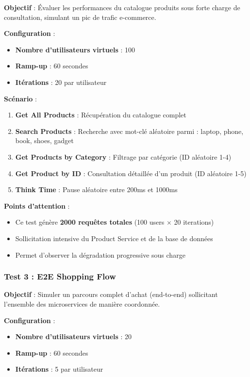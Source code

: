 \textbf{Objectif} : Évaluer les performances du catalogue produits sous forte charge de consultation, simulant un pic de trafic e-commerce.

\textbf{Configuration} :
\begin{itemize}
    \item \textbf{Nombre d'utilisateurs virtuels} : 100
    \item \textbf{Ramp-up} : 60 secondes
    \item \textbf{Itérations} : 20 par utilisateur
\end{itemize}

\textbf{Scénario} :
\begin{enumerate}
    \item \textbf{Get All Products} : Récupération du catalogue complet
    \item \textbf{Search Products} : Recherche avec mot-clé aléatoire parmi : laptop, phone, book, shoes, gadget
    \item \textbf{Get Products by Category} : Filtrage par catégorie (ID aléatoire 1-4)
    \item \textbf{Get Product by ID} : Consultation détaillée d'un produit (ID aléatoire 1-5)
    \item \textbf{Think Time} : Pause aléatoire entre 200ms et 1000ms
\end{enumerate}

\textbf{Points d'attention} :
\begin{itemize}
    \item Ce test génère \textbf{2000 requêtes totales} (100 users × 20 iterations)
    \item Sollicitation intensive du Product Service et de la base de données
    \item Permet d'observer la dégradation progressive sous charge
\end{itemize}

\subsubsection{Test 3 : E2E Shopping Flow}

\textbf{Objectif} : Simuler un parcours complet d'achat (end-to-end) sollicitant l'ensemble des microservices de manière coordonnée.

\textbf{Configuration} :
\begin{itemize}
    \item \textbf{Nombre d'utilisateurs virtuels} : 20
    \item \textbf{Ramp-up} : 60 secondes
    \item \textbf{Itérations} : 5 par utilisateur
\end{itemize}

